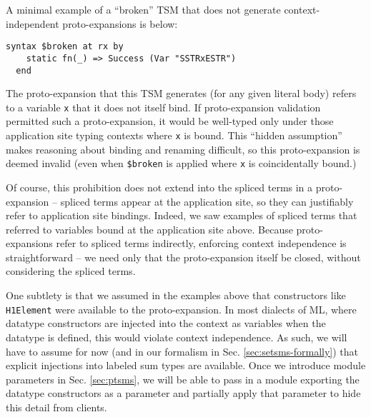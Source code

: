 \documentclass[acmlarge,review,anonymous]{acmart}\settopmatter{printfolios=true}
\newcommand{\li}[1]{\lstinline{#1}}
\begin{document}
A minimal example of a ``broken'' TSM that does not generate context-independent proto-expansions is below:
\begin{lstlisting}[numbers=none]
  syntax $broken at rx by
    static fn(_) => Success (Var "SSTRxESTR")
  end
\end{lstlisting}
The proto-expansion that this TSM generates (for any given literal body) refers to a variable \li{x} that it does not itself bind. If proto-expansion validation permitted such a proto-expansion, it would be well-typed only under those application site typing contexts where \li{x} is bound. This ``hidden assumption'' makes reasoning about binding and renaming difficult, so this proto-expansion is deemed invalid (even when \li{$broken} is applied where \li{x} is coincidentally bound.)

Of course, this prohibition does not extend into the spliced terms in a proto-expansion -- spliced terms appear at the application site, so they can justifiably refer to application site bindings. Indeed, we saw examples of spliced terms that referred to variables bound at the application site above. Because proto-expansions refer to spliced terms indirectly, enforcing context independence is straightforward -- we need only that the proto-expansion itself be closed, without considering the spliced terms.%

One subtlety is that we assumed in the examples above that constructors like \li{H1Element} were available to the proto-expansion. In most dialects of ML, where datatype constructors are injected into the context as variables when the datatype is defined, this would violate context independence. As such, we will have to assume for now (and in our formalism in Sec. \ref{sec:setsms-formally}) that explicit injections into labeled sum types are available. Once we introduce module parameters in Sec. \ref{sec:ptsms}, we will be able to pass in a module exporting the datatype constructors as a parameter and partially apply that parameter to hide this detail from clients.

\end{document}
